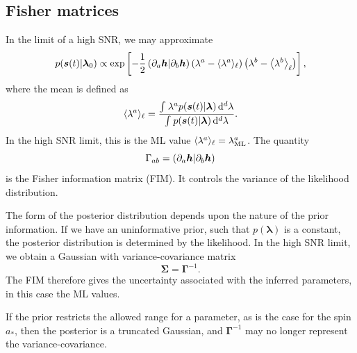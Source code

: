 \subsection{Fisher matrices}\label{sec:Fisher}

In the limit of a high SNR, we may approximate \citep{Vallisneri2008}
\begin{equation}
p(\boldsymbol{s}(t)|\boldsymbol{\lambda}_0) \propto \exp\left[-\dfrac{1}{2}\left({\partial_a\boldsymbol{h}}\middle|{\partial_b\boldsymbol{h}}\right)\left(\lambda^a - \langle\lambda^a\rangle_\ell\right)\left(\lambda^b - \left\langle\lambda^b\right\rangle_\ell\right)\right],
\label{eq:LSA}
\end{equation}
where the mean is defined as
\begin{equation}
\langle\lambda^a\rangle_\ell = \dfrac{\int_{}^{}{\lambda^a p(\boldsymbol{s}(t)|\boldsymbol{\lambda})}\,\mathrm{d}{^d \lambda}}{\int_{}^{}{p(\boldsymbol{s}(t)|\boldsymbol{\lambda})}\,\mathrm{d}{^d \lambda}}.
\end{equation}
In the high SNR limit, this is the ML value $\langle\lambda^a\rangle_\ell = \lambda^a_\mathrm{ML}$. The quantity
\begin{equation}
\Gamma_{ab} = \left({\partial_a\boldsymbol{h}}\middle|{\partial_b\boldsymbol{h}}\right)
\label{eq:Fisher}
\end{equation}
is the Fisher information matrix (FIM). It controls the variance of the likelihood distribution.

The form of the posterior distribution depends upon the nature of the prior information. If we have an uninformative prior, such that $p(\boldsymbol{\lambda})$ is a constant, the posterior distribution is determined by the likelihood. In the high SNR limit, we obtain a Gaussian with variance-covariance matrix
\begin{equation}
\boldsymbol{\Sigma} = \boldsymbol{\Gamma}^{-1}.
\label{eq:InvFisher}
\end{equation}
The FIM therefore gives the uncertainty associated with the inferred parameters, in this case the ML values.

If the prior restricts the allowed range for a parameter, as is the case for the spin $a_\ast$, then the posterior is a truncated Gaussian, and $\boldsymbol{\Gamma}^{-1}$ may no longer represent the variance-covariance.

